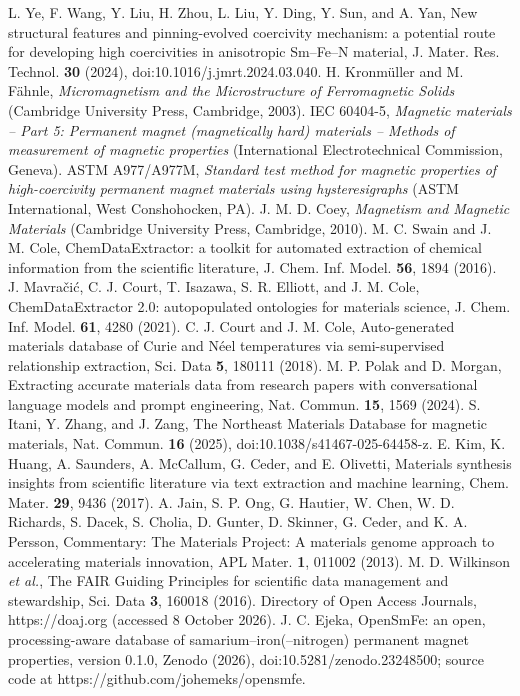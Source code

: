 \documentclass[10pt,twocolumn,letterpaper]{article}
\begin{document}
 L. Ye, F. Wang, Y. Liu, H. Zhou, L. Liu, Y. Ding, Y. Sun, and A. Yan, New structural features and pinning-evolved coercivity mechanism: a potential route for developing high coercivities in anisotropic Sm--Fe--N material, J. Mater. Res. Technol. \textbf{30} (2024), doi:10.1016/j.jmrt.2024.03.040.
 H. Kronm\"uller and M. F\"ahnle, \textit{Micromagnetism and the Microstructure of Ferromagnetic Solids} (Cambridge University Press, Cambridge, 2003).
 IEC 60404-5, \textit{Magnetic materials -- Part 5: Permanent magnet (magnetically hard) materials -- Methods of measurement of magnetic properties} (International Electrotechnical Commission, Geneva).
 ASTM A977/A977M, \textit{Standard test method for magnetic properties of high-coercivity permanent magnet materials using hysteresigraphs} (ASTM International, West Conshohocken, PA).
 J. M. D. Coey, \textit{Magnetism and Magnetic Materials} (Cambridge University Press, Cambridge, 2010).
 M. C. Swain and J. M. Cole, ChemDataExtractor: a toolkit for automated extraction of chemical information from the scientific literature, J. Chem. Inf. Model. \textbf{56}, 1894 (2016).
 J. Mavra\v{c}i\'c, C. J. Court, T. Isazawa, S. R. Elliott, and J. M. Cole, ChemDataExtractor 2.0: autopopulated ontologies for materials science, J. Chem. Inf. Model. \textbf{61}, 4280 (2021).
 C. J. Court and J. M. Cole, Auto-generated materials database of Curie and N\'eel temperatures via semi-supervised relationship extraction, Sci. Data \textbf{5}, 180111 (2018).
 M. P. Polak and D. Morgan, Extracting accurate materials data from research papers with conversational language models and prompt engineering, Nat. Commun. \textbf{15}, 1569 (2024).
 S. Itani, Y. Zhang, and J. Zang, The Northeast Materials Database for magnetic materials, Nat. Commun. \textbf{16} (2025), doi:10.1038/s41467-025-64458-z.
 E. Kim, K. Huang, A. Saunders, A. McCallum, G. Ceder, and E. Olivetti, Materials synthesis insights from scientific literature via text extraction and machine learning, Chem. Mater. \textbf{29}, 9436 (2017).
 A. Jain, S. P. Ong, G. Hautier, W. Chen, W. D. Richards, S. Dacek, S. Cholia, D. Gunter, D. Skinner, G. Ceder, and K. A. Persson, Commentary: The Materials Project: A materials genome approach to accelerating materials innovation, APL Mater. \textbf{1}, 011002 (2013).
 M. D. Wilkinson \textit{et al.}, The FAIR Guiding Principles for scientific data management and stewardship, Sci. Data \textbf{3}, 160018 (2016).
 Directory of Open Access Journals, https://doaj.org (accessed 8 October 2026).
 J. C. Ejeka, OpenSmFe: an open, processing-aware database of samarium--iron(--nitrogen) permanent magnet properties, version 0.1.0, Zenodo (2026), doi:10.5281/zenodo.23248500; source code at https://github.com/johemeks/opensmfe.
\end{document}
